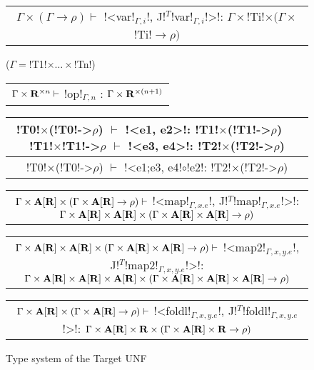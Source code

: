 \begin{figure*}[tb]
    \centering
    \begin{tabular}{c} 
    \\\hline
    $\Gamma\times(\Gamma\to \rho)  \vdash$ !<var!$_{\Gamma,i}$!, J!$^T$!var!$_{\Gamma,i}$!>!: $\Gamma\times$!Ti!$\times(\Gamma\times$!Ti!$\to \rho)$ 
    \end{tabular}($\Gamma=$!T1!$\times\ldots\times$!Tn!)
    \hspace{0.5cm}
    \begin{tabular}{c}
        \\\hline
        $\Gamma\times\mathbf{R}^{\times n} \vdash$ !op!$_{\Gamma,n}$ : $\Gamma\times\mathbf{R}^{\times(n+1)}$
    \end{tabular}

    \begin{tabular}{c}
    !T0!$\times$(!T0!->$\rho$) $\vdash$ !<e1, e2>!: !T1!$\times$(!T1!->$\rho$) $\quad$ !T1!$\times$!T1!->$\rho$ $\vdash$ !<e3, e4>!: !T2!$\times$(!T2!->$\rho$) \\\hline
    !T0!$\times$(!T0!->$\rho$) $\vdash$ !<e1;e3, e4!$\circ$!e2!: !T2!$\times$(!T2!->$\rho$)
    \end{tabular}

    \begin{tabular}{c}
        \\\hline  
        $\Gamma \times \mathbf{A}[\mathbf{R}]\times(\Gamma \times \mathbf{A}[\mathbf{R}]\to \rho) \vdash$ !<map!$_{\Gamma,x.e}$!, J!$^T$!map!$_{\Gamma,x.e}$!>!: $\Gamma \times \mathbf{A}[\mathbf{R}] \times \mathbf{A}[\mathbf{R}] \times(\Gamma \times \mathbf{A}[\mathbf{R}] \times \mathbf{A}[\mathbf{R}] \to\rho) $
    \end{tabular}

    \begin{tabular}{c}
        \\\hline  
        $\Gamma \times \mathbf{A}[\mathbf{R}] \times \mathbf{A}[\mathbf{R}]\times(\Gamma \times \mathbf{A}[\mathbf{R}] \times \mathbf{A}[\mathbf{R}]\to\rho) \vdash$ !<map2!$_{\Gamma,x,y.e}$!, J!$^T$!map2!$_{\Gamma,x,y.e}$!>!: $\Gamma \times \mathbf{A}[\mathbf{R}] \times \mathbf{A}[\mathbf{R}] \times \mathbf{A}[\mathbf{R}]\times(\Gamma \times \mathbf{A}[\mathbf{R}] \times \mathbf{A}[\mathbf{R}] \times \mathbf{A}[\mathbf{R}]\to\rho)$
    \end{tabular}

    \begin{tabular}{c}
        \\\hline  
        $\Gamma \times \mathbf{A}[\mathbf{R}]\times(\Gamma \times \mathbf{A}[\mathbf{R}]\to\rho) \vdash$ !<foldl!$_{\Gamma,x,y.e}$!, J!$^T$!foldl!$_{\Gamma,x,y.e}$!>!: $\Gamma \times \mathbf{A}[\mathbf{R}] \times \mathbf{R}\times(\Gamma \times \mathbf{A}[\mathbf{R}] \times \mathbf{R}\to\rho)$
    \end{tabular}
    \vspace{-0.2cm}
    \caption{Type system of the Target UNF}
    \vspace{-0.4cm}
    \label{fig:target_unf_typesystem}
    \end{figure*}